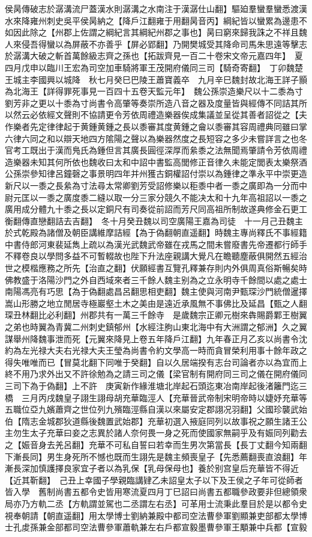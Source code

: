 侯昺傳破志於潺溝流尸蓋漢水則潺溝之水南注于漢潺仕山翻】驅廹羣蠻羣蠻悉渡漢水來降雍州刺史吳平侯昺納之【降戶江翻雍于用翻昺音丙】綱紀皆以蠻累為邊患不如因此除之【州郡上佐謂之綱紀言其綱紀州郡之事也】昺曰窮來歸我誅之不祥且魏人來侵吾得蠻以為屏蔽不亦善乎【屏必郢翻】乃開樊城受其降命司馬朱思遠等擊志於潺溝大破之斬首萬餘級志齊之孫也【拓跋齊見一百二十卷宋文帝元嘉四年】　夏四月戊申以臨川王宏為司空加車騎將軍王茂開府儀同三司【騎奇寄翻】　丁卯魏楚王城主李國興以城降　秋七月癸巳巴陵王蕭寶義卒　九月辛巳魏封故北海王詳子顥為北海王【詳得罪死事見一百四十五卷天監元年】　魏公孫崇造樂尺以十二黍為寸劉芳非之更以十黍為寸尚書令高肇等奏崇所造八音之器及度量皆與經傳不同詰其所以然云必依經文聲則不協請更令芳依周禮造樂器俟成集議並呈從其善者詔從之【夫作樂者先定律律起于黄鍾黄鍾之長以黍審其度黄鍾之龠以黍審其容周禮典同雖曰掌六律六同之和以辯天地四方隂陽之聲以為樂器然度之長短容之多少未嘗詳言之也冬官考工既出于漢而鳬氏為鍾但言其廣長圓徑深厚而絫黍之法無聞焉肇請令芳依周禮造樂器未知其何所依也魏收曰太和中詔中書監高閭修正音律久未能定閭表太樂祭酒公孫崇參知律呂鐘磬之事景明四年并州獲古銅權詔付崇以為鍾律之準永平中崇更造新尺以一黍之長絫為寸法尋太常卿劉芳受詔修樂以秬黍中者一黍之廣即為一分而中尉元匡以一黍之廣度黍二縫以取一分三家分競久不能决太和十九年高祖詔以一黍之廣用成分體九十黍之長以定銅尺有司奏從前詔而芳尺同高祖所制故遂典修金石更工衡翻傳直戀翻詰去吉翻】　冬十月癸丑魏以司空廣陽王嘉為司徒　十一月己丑魏主於式乾殿為諸僧及朝臣講維摩詰經【為于偽翻朝直遥翻】時魏主專尚釋氏不事經籍中書侍郎河東裴延雋上疏以為漢光武魏武帝雖在戎馬之間未嘗廢書先帝遷都行師手不釋卷良以學問多益不可暫輟故也陛下升法座親講大覺凡在瞻聽塵蔽俱開然五經治世之模楷應務之所先【治直之翻】伏願經書互覽孔釋兼存則内外俱周真俗斯暢矣時佛教盛于洛陽沙門之外自西域來者三千餘人魏主别為之立永明寺千餘間以處之處士南陽馮亮有巧思【為于偽翻處昌呂翻思相吏翻】魏主使與河南尹甄琛沙門統僧暹擇嵩山形勝之地立閒居寺極巖壑土木之美由是遠近承風無不事佛比及延昌【甄之人翻琛丑林翻比必利翻】州郡共有一萬三千餘寺　是歲魏宗正卿元樹來犇賜爵鄴王樹翼之弟也時翼為青冀二州刺史鎮郁州【水經注朐山東北海中有大洲謂之郁洲】久之翼謀舉州降魏事泄而死【元翼來降見上卷五年降戶江翻】九年春正月乙亥以尚書令沈約為左光禄大夫右光禄大夫王瑩為尚書令約文學高一時而貪冒榮利用事十餘年政之得失唯唯而已【冒莫北翻下同唯于癸翻】自以久居端揆有志台司論者亦以為宜而上終不用乃求外出又不許徐勉為之請三司之儀【梁官制有開府同三司之儀在開府儀同三司下為于偽翻】上不許　庚寅新作緣淮塘北岸起石頭迄東冶南岸起後渚籬門迄三橋　三月丙戌魏皇子詡生詡母胡充華臨涇人【充華晉武帝制宋明帝時以婕妤充華等五職位亞九嬪蕭齊之世位列九殯臨涇縣自漢以來屬安定郡詡况羽翻】父國珍襲武始伯【隋志金城郡狄道縣後魏置武始郡】充華初選入掖庭同列以故事祝之願生諸王公主勿生太子充華曰妾之志異於諸人奈何畏一身之死而使國家無嗣乎及有娠同列勸去之【娠音身去羌呂翻】充華不可私自誓曰若幸而生男次第當長【長丁丈翻今知兩翻下漸長同】男生身死所不憾也既而生詡先是魏主頻喪皇子【先悉薦翻喪直浪翻】年漸長深加慎護擇良家宜子者以為乳保【乳母保母也】養於别宫皇后充華皆不得近【近其靳翻】　己丑上幸國子學親臨講肄乙未詔皇太子以下及王侯之子年可從師者皆入學　舊制尚書五都令史皆用寒流夏四月丁巳詔曰尚書五都職參政要非但總領衆局亦乃方軌二丞【方軌謂並駕也二丞謂左右丞】可革用士流秉此羣目於是以都令史視奉朝請【朝直遥翻】用太學博士劉納兼殿中都司空法曹參軍劉顯兼吏部都太學博士孔䖍孫兼金部都司空法曹參軍蕭軌兼左右戶都宣毅墨曹參軍王顒兼中兵都【宣毅